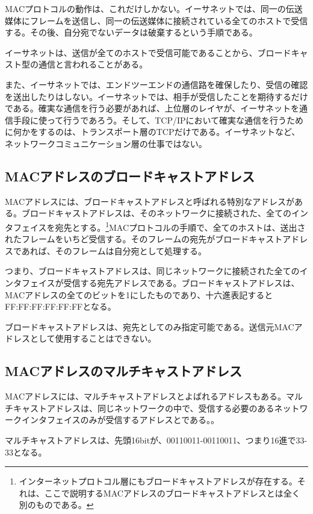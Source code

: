 MACプロトコルの動作は、これだけしかない。イーサネットでは、同一の伝送媒体にフレームを送信し、同一の伝送媒体に接続されている全てのホストで受信する。その後、自分宛でないデータは破棄するという手順である。

イーサネットは、送信が全てのホストで受信可能であることから、ブロードキャスト型の通信と言われることがある。

また、イーサネットでは、エンドツーエンドの通信路を確保したり、受信の確認を送出したりはしない。イーサネットでは、相手が受信したことを期待するだけである。確実な通信を行う必要があれば、上位層のレイヤが、イーサネットを通信手段に使って行うであろう。そして、TCP/IPにおいて確実な通信を行うために何かをするのは、トランスポート層のTCPだけである。イーサネットなど、ネットワークコミュニケーション層の仕事ではない。


\subsection{MACアドレスのブロードキャストアドレス}

MACアドレスには、ブロードキャストアドレスと呼ばれる特別なアドレスがある。ブロードキャストアドレスは、そのネットワークに接続された、全てのインタフェイスを宛先とする。\footnote{インターネットプロトコル層にもブロードキャストアドレスが存在する。それは、ここで説明するMACアドレスのブロードキャストアドレスとは全く別のものである。}MACプロトコルの手順で、全てのホストは、送出されたフレームをいちど受信する。そのフレームの宛先がブロードキャストアドレスであれば、そのフレームは自分宛として処理する。

つまり、ブロードキャストアドレスは、同じネットワークに接続された全てのインタフェイスが受信する宛先アドレスである。ブロードキャストアドレスは、MACアドレスの全てのビットを1にしたものであり、十六進表記するとFF:FF:FF:FF:FF:FFとなる。

ブロードキャストアドレスは、宛先としてのみ指定可能である。送信元MACアドレスとして使用することはできない。

\subsection{MACアドレスのマルチキャストアドレス}
MACアドレスには、マルチキャストアドレスとよばれるアドレスもある。マルチキャストアドレスは、同じネットワークの中で、受信する必要のあるネットワークインタフェイスのみが受信するアドレスとである。。

マルチキャストアドレスは、先頭16bitが、00110011-00110011、つまり16進で33-33となる。

